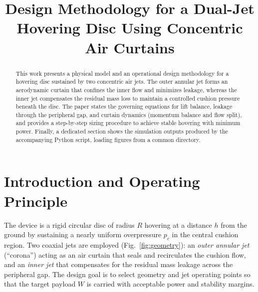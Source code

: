 \documentclass[11pt,a4paper]{article}
\title{Design Methodology for a Dual-Jet Hovering Disc Using Concentric Air Curtains}
\author{ }
\date{ }
\begin{document}
\maketitle

\begin{abstract}
This work presents a physical model and an operational design methodology for a hovering disc sustained by two concentric air jets.
The outer annular jet forms an aerodynamic curtain that confines the inner flow and minimizes leakage, whereas the inner jet compensates the residual mass loss to maintain a controlled cushion pressure beneath the disc. The paper states the governing equations for lift balance, leakage through the peripheral gap, and curtain dynamics (momentum balance and flow split), and provides a step-by-step sizing procedure to achieve stable hovering with minimum power. Finally, a dedicated section shows the simulation outputs produced by the accompanying Python script, loading figures from a common directory.
\end{abstract}

\section{Introduction and Operating Principle}
The device is a rigid circular disc of radius $R$ hovering at a distance $h$ from the ground by sustaining a nearly uniform overpressure $p_c$ in the central cushion region. Two coaxial jets are employed (Fig.~\ref{fig:geometry}): an \emph{outer annular jet} (``corona'') acting as an air curtain that seals and recirculates the cushion flow, and an \emph{inner jet} that compensates for the residual mass leakage across the peripheral gap.
The design goal is to select geometry and jet operating points so that the target payload $W$ is carried with acceptable power and stability margins.
\end{document}
